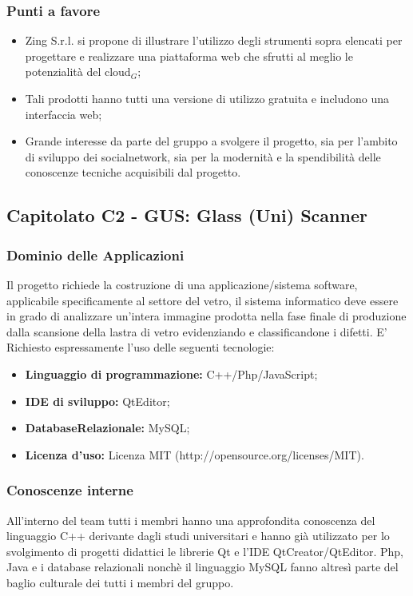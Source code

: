  \subsubsection{Punti a favore}
  \begin{itemize}
     \item Zing S.r.l. si propone di illustrare l’utilizzo degli strumenti sopra elencati per progettare e realizzare una piattaforma web che sfrutti al meglio le potenzialità del cloud$_G$;
     \item Tali prodotti hanno tutti una versione di utilizzo gratuita e includono una interfaccia web;
     \item Grande interesse da parte del gruppo a svolgere il progetto, sia per l'ambito di sviluppo dei socialnetwork, sia per la modernità e la spendibilità delle conoscenze tecniche acquisibili dal progetto.
  \end{itemize}
\subsection{Capitolato C2 - GUS: Glass (Uni) Scanner}
  \subsubsection{Dominio delle Applicazioni}
  Il progetto richiede la costruzione di una applicazione/sistema software, applicabile specificamente al settore del vetro, il  sistema  informatico deve essere in grado di analizzare un'intera immagine prodotta nella fase finale di produzione dalla scansione della lastra di vetro evidenziando e classificandone i difetti. E' Richiesto espressamente l'uso delle seguenti tecnologie:
  \begin{itemize}
  	\item \textbf{Linguaggio  di  programmazione:} C++/Php/JavaScript;
  	\item \textbf{IDE di sviluppo:} QtEditor;
  	\item \textbf{DatabaseRelazionale:} MySQL;
  	\item \textbf{Licenza d'uso:} Licenza MIT (http://opensource.org/licenses/MIT).
  \end{itemize}
  \subsubsection{Conoscenze interne}
  All'interno del team tutti i membri hanno una approfondita conoscenza del linguaggio C++ derivante dagli studi universitari e hanno già utilizzato per lo svolgimento di progetti didattici le librerie Qt e l'IDE QtCreator/QtEditor. Php, Java e i database relazionali nonchè il linguaggio MySQL fanno altresì parte del baglio culturale dei tutti i membri del gruppo.
